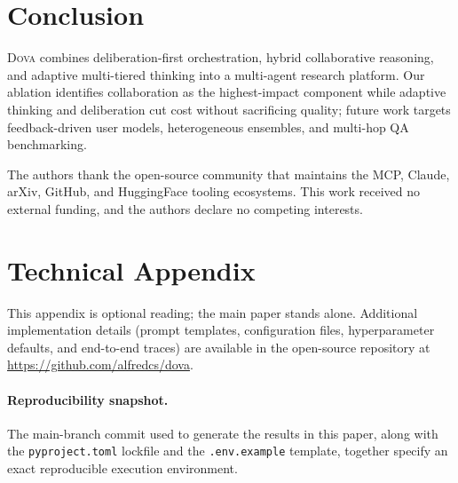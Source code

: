 \documentclass{article}
\theoremstyle{plain}
\theoremstyle{definition}
\newcommand{\dova}{\textsc{Dova}}
\begin{document}
\section{Conclusion}\label{sec:conclusion}

\dova{} combines deliberation-first orchestration, hybrid collaborative
reasoning, and adaptive multi-tiered thinking into a multi-agent research
platform.  Our ablation identifies collaboration as the highest-impact
component while adaptive thinking and deliberation cut cost without
sacrificing quality; future work targets feedback-driven user models,
heterogeneous ensembles, and multi-hop QA benchmarking.

\begin{ack}
The authors thank the open-source community that maintains the MCP, Claude,
arXiv, GitHub, and HuggingFace tooling ecosystems. This work received no
external funding, and the authors declare no competing interests.
\end{ack}




\newpage
\appendix

\section{Technical Appendix}\label{app:technical}

This appendix is optional reading; the main paper stands alone.  Additional
implementation details (prompt templates, configuration files, hyperparameter
defaults, and end-to-end traces) are available in the open-source repository
at \url{https://github.com/alfredcs/dova}.

\paragraph{Reproducibility snapshot.} The main-branch commit used to generate
the results in this paper, along with the \texttt{pyproject.toml}
lockfile and the \texttt{.env.example} template, together specify an exact
reproducible execution environment.
\end{document}
